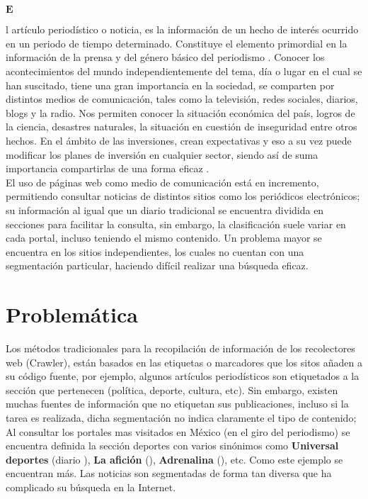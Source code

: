 	








\ \\\\
\begin{Large}$\mathbf{E}$\end{Large}l artículo periodístico o noticia, es la información de un hecho de interés 
  ocurrido en un periodo de tiempo determinado. Constituye el elemento primordial en la información de la prensa y 
  del género básico del periodismo \citep{CU1}. Conocer los acontecimientos del mundo independientemente del tema, día o 
  lugar en el cual se han suscitado, tiene una gran importancia en la sociedad, se comparten por distintos medios de comunicación, 
  tales como la televisión, redes sociales, diarios, blogs y la radio. Nos permiten conocer la situación económica del país, logros 
  de la ciencia, desastres naturales, la situación en cuestión de inseguridad entre otros hechos. En el ámbito de las inversiones, 
  crean expectativas y eso a su vez puede modificar los planes de inversión en cualquier sector, siendo así de suma importancia 
  compartirlas de una forma eficaz \citep{CU2}.\\

El uso de páginas web como medio de comunicación está en incremento, permitiendo consultar noticias de distintos sitios como 
los periódicos electrónicos; su información al igual que un diario tradicional se encuentra dividida en secciones para facilitar 
la consulta, sin embargo, la clasificación suele variar en cada portal, incluso teniendo el mismo contenido. Un problema mayor se 
encuentra en los sitios independientes, los cuales no cuentan con una segmentación particular, haciendo difícil realizar una búsqueda eficaz.\\



\section{Problemática}


Los métodos tradicionales para la recopilación de información de los recolectores web (Crawler), están basados en las etiquetas o 
marcadores que los sitos añaden a su código fuente, por ejemplo, algunos artículos periodísticos son etiquetados a la sección que pertenecen 
(política, deporte, cultura, etc). Sin embargo, existen muchas fuentes de información que no etiquetan sus publicaciones, incluso si la tarea 
es realizada, dicha segmentación no indica claramente el tipo de contenido; Al consultar los portales mas visitados en México (en el giro del periodismo) 
se encuentra definida la sección deportes con varios sinónimos como \textbf{Universal deportes} (diario ), \textbf{La afición} 
(), \textbf{Adrenalina} (), etc. Como este ejemplo se encuentran más. Las noticias son segmentadas de forma tan diversa que 
ha complicado su búsqueda en la Internet.\\



